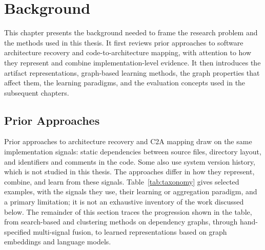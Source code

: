 \chapter{Background \label{ch:background}}
\chaptertoc

This chapter presents the background needed to frame the research problem and the methods used in this thesis. It first reviews prior approaches to software architecture recovery and code-to-architecture mapping, with attention to how they represent and combine implementation-level evidence. It then introduces the artifact representations, graph-based learning methods, the graph properties that affect them, the learning paradigms, and the evaluation concepts used in the subsequent chapters.

\section{Prior Approaches \label{sec:bg_prior}}

Prior approaches to architecture recovery and C2A mapping draw on the same implementation signals: static dependencies between source files, directory layout, and identifiers and comments in the code. Some also use system version history, which is not studied in this thesis. The approaches differ in how they represent, combine, and learn from these signals. Table~\ref{tab:taxonomy} gives selected examples, with the signals they use, their learning or aggregation paradigm, and a primary limitation; it is not an exhaustive inventory of the work discussed below. The remainder of this section traces the progression shown in the table, from search-based and clustering methods on dependency graphs, through hand-specified multi-signal fusion, to learned representations based on graph embeddings and language models.

